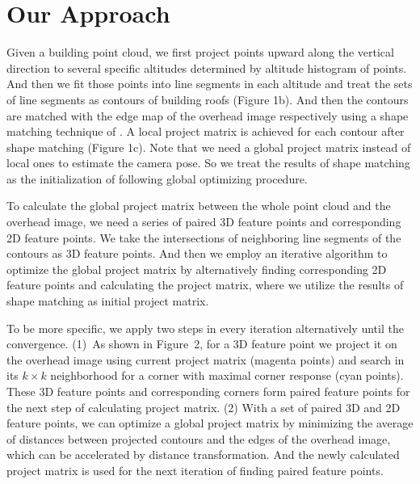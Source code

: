 \section{Our Approach}
Given a building point cloud, we first project points upward along the vertical direction to several specific altitudes determined by altitude histogram of points. And then we fit those points into line segments in each altitude and treat the sets of line segments as contours of building roofs (Figure 1b). 
And then the contours are matched with the edge map of the overhead image respectively using a shape matching technique of \cite{FDCM}. A local project matrix is achieved for each contour after shape matching (Figure 1c). Note that we need a global project matrix instead of local ones to estimate the camera pose. So we treat the results of shape matching as the initialization of following global optimizing procedure. 

To calculate the global project matrix between the whole point cloud and the overhead image, we need a series of paired 3D feature points and corresponding 2D feature points. We take the intersections of neighboring line segments of the contours as 3D feature points. And then we employ an iterative algorithm to optimize the global project matrix by alternatively finding corresponding 2D feature points and calculating the project matrix, where we utilize the results of shape matching as initial project matrix.

To be more specific, we apply two steps in every iteration alternatively until the convergence. (1)~As shown in Figure~2, for a 3D feature point we project it on the overhead image using current project matrix (magenta points) and search in its $k\times k$ neighborhood for a corner with maximal corner response (cyan points). These 3D feature points and corresponding corners form paired feature points for the next step of calculating project matrix.
(2) With a set of paired 3D and 2D feature points, we can optimize a global project matrix by minimizing the average of distances between projected contours and the edges of the overhead image, which can be accelerated by distance transformation. And the newly calculated project matrix is used for the next iteration of finding paired feature points.

